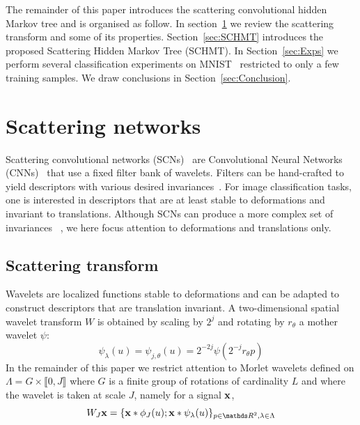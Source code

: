 \documentclass{article}
\begin{document}
  The remainder of this paper introduces the scattering convolutional hidden Markov tree and is organised as follow. In section~\ref{sec:SCN} we review the scattering transform and some of its properties. Section~\ref{sec:SCHMT} introduces the proposed Scattering Hidden Markov Tree (SCHMT). In Section~\ref{sec:Exps} we perform several classification experiments on MNIST~\cite{lecun2016web} restricted  to only a few training samples. We draw conclusions in Section~\ref{sec:Conclusion}.
  
\section{Scattering networks}
  \label{sec:SCN}
  \vspace{-5pt}
  Scattering convolutional networks (SCNs)~\cite{bruna2013scattering} are Convolutional Neural Networks (CNNs)~\cite{lecun1995convolutional} that use a fixed filter bank of wavelets. Filters can be hand-crafted to yield descriptors with various desired invariances~\cite{mallat2012gis}. For image classification tasks, one is interested in descriptors that are at least stable to deformations and invariant to translations. Although SCNs can produce a more complex set of invariances~\cite{sifre2013rotation, oyallon2014deep} , we here focus attention to deformations and translations only.

  \vspace{-5pt}
  \subsection{Scattering transform}
    \label{subsec:SCN/ST}
    \vspace{-5pt}
    Wavelets are localized functions stable to deformations and can be adapted to construct descriptors that are translation invariant. A two-dimensional spatial wavelet transform $W$ is obtained by scaling
    by $2^{j}$ and rotating by $r_{\theta}$ a mother wavelet $\psi$:
    \vspace{-5pt}
    \begin{equation}
      \label{eq:multi-scale directional wavelet}
      \psi_{\lambda}(u) = \psi_{j,\theta}(u) = 2^{-2j} \psi(2^{-j}r_{\theta}p)
    \end{equation}
    In the remainder of this paper we restrict attention to Morlet wavelets defined on $\Lambda = G \times \llbracket 0,J \rrbracket$ where $G$ is a finite group of rotations of cardinality $L$ and where the wavelet is taken at scale $J$, namely for a signal ${\bf x}$,
    \vspace{-5pt}
    \begin{equation}
      \label{eq:wavelet transform}
      W_{J}\bfx = \{ \bfx \ast \phi_{J}(u); \bfx \ast \psi_{\lambda}(u) \}_{p\in\dsR^{2},\lambda \in \Lambda}
    \end{equation}
    \vspace{-15pt}
    
\end{document}

